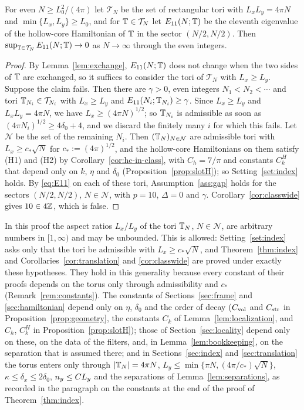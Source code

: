 \begin{corollary}\label{cor:uniform}
For even $N\ge L_0^2/(4\pi)$ let $\mathcal T_N$ be the set of rectangular tori with $L_xL_y=4\pi N$ and
$\min\{L_x,L_y\}\ge L_0$, and for $\mathbb{T}\in\mathcal T_N$ let $E_{11}(N;\mathbb{T})$ be the eleventh eigenvalue of the hollow-core
Hamiltonian of $\mathbb{T}$ in the sector $(N/2,N/2)$. Then $\sup_{\mathbb{T}\in\mathcal T_N}E_{11}(N;\mathbb{T})\to0$ as $N\to\infty$ through
the even integers.
\end{corollary}

\begin{proof}
By Lemma~\ref{lem:exchange}, $E_{11}(N;\mathbb{T})$ does not change when the two sides of $\mathbb{T}$ are exchanged, so it suffices to
consider the tori of $\mathcal T_N$ with $L_x\ge L_y$. Suppose the claim fails. Then there are $\gamma>0$, even integers
$N_1<N_2<\cdots$ and tori $\mathbb{T}_{N_i}\in\mathcal T_{N_i}$ with $L_x\ge L_y$ and $E_{11}(N_i;\mathbb{T}_{N_i})\ge\gamma$. Since
$L_x\ge L_y$ and $L_xL_y=4\pi N$, we have $L_x\ge(4\pi N)^{1/2}$; so $\mathbb{T}_{N_i}$ is admissible as soon as
$(4\pi N_i)^{1/2}\ge4\delta_0+4$, and we discard the finitely many $i$ for which this fails. Let $\mathcal N$ be the set of
the remaining $N_i$. Then $(\mathbb{T}_N)_{N\in\mathcal N}$ are admissible tori with $L_x\ge c_*\sqrt N$ for $c_*:=(4\pi)^{1/2}$,
and the hollow-core Hamiltonians on them satisfy (H1) and (H2) by Corollary~\ref{cor:hc-in-class}, with $C_h=7/\pi$ and
constants $C^H_k$ that depend only on $k$, $\eta$ and $\delta_0$ (Proposition~\ref{prop:slotH}); so
Setting~\ref{set:index} holds. By \eqref{eq:E11} on each of these tori, Assumption~\ref{ass:gap} holds for the sectors
$(N/2,N/2)$, $N\in\mathcal N$, with $p=10$, $\Delta=0$ and $\gamma$. Corollary~\ref{cor:classwide} gives $10\in4\mathbb{Z}$, which is
false.
\end{proof}

In this proof the aspect ratios $L_x/L_y$ of the tori $\mathbb{T}_N$, $N\in\mathcal N$, are arbitrary numbers in $[1,\infty)$
and may be unbounded. This is allowed: Setting~\ref{set:index} asks only that the tori be admissible with
$L_x\ge c_*\sqrt N$, and Theorem~\ref{thm:index} and Corollaries~\ref{cor:translation} and \ref{cor:classwide} are proved
under exactly these hypotheses. They hold in this generality because every constant of their proofs depends on the
torus only through admissibility and $c_*$ (Remark~\ref{rem:constants}). The constants of Sections~\ref{sec:frame} and
\ref{sec:hamiltonian} depend only on $\eta$, $\delta_0$ and the order of decay ($C_{\mathrm{vol}}$ and $C_{\rm str}$ in
Proposition~\ref{prop:geometry}, the constants $C_k$ of Lemma~\ref{lem:localization}, and $C_h$, $C^H_k$ in
Proposition~\ref{prop:slotH}); those of Section~\ref{sec:locality} depend only on these, on the data of the filters, and,
in Lemma~\ref{lem:bookkeeping}, on the separation that is assumed there; and in Sections~\ref{sec:index} and
\ref{sec:translation} the torus enters only through $\lvert\mathbb{T}_N\rvert=4\pi N$, $L_y\le\min\{\pi N,(4\pi/c_*)\sqrt N\}$,
$\kappa\le\delta_x\le2\delta_0$, $n_y\le CL_y$ and the separations of Lemma~\ref{lem:separations}, as recorded in the
paragraph on the constants at the end of the proof of Theorem~\ref{thm:index}.

